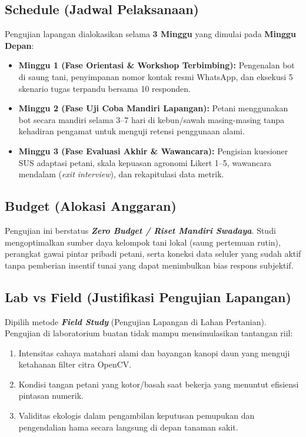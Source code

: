 \documentclass[11pt,a4paper]{article}
\begin{document}
\subsection{Schedule (Jadwal Pelaksanaan)}
Pengujian lapangan dialokasikan selama \textbf{3 Minggu} yang dimulai pada \textbf{Minggu Depan}:
\begin{itemize}[noitemsep]
    \item \textbf{Minggu 1 (Fase Orientasi \& Workshop Terbimbing):} Pengenalan bot di saung tani, penyimpanan nomor kontak resmi WhatsApp, dan eksekusi 5 skenario tugas terpandu bersama 10 responden.
    \item \textbf{Minggu 2 (Fase Uji Coba Mandiri Lapangan):} Petani menggunakan bot secara mandiri selama 3--7 hari di kebun/sawah masing-masing tanpa kehadiran pengamat untuk menguji retensi penggunaan alami.
    \item \textbf{Minggu 3 (Fase Evaluasi Akhir \& Wawancara):} Pengisian kuesioner SUS adaptasi petani, skala kepuasan agronomi Likert 1--5, wawancara mendalam (\textit{exit interview}), dan rekapitulasi data metrik.
\end{itemize}

\subsection{Budget (Alokasi Anggaran)}
Pengujian ini berstatus \textbf{\textit{Zero Budget / Riset Mandiri Swadaya}}. Studi mengoptimalkan sumber daya kelompok tani lokal (saung pertemuan rutin), perangkat gawai pintar pribadi petani, serta koneksi data seluler yang sudah aktif tanpa pemberian insentif tunai yang dapat menimbulkan bias respons subjektif.

\subsection{Lab vs Field (Justifikasi Pengujian Lapangan)}
Dipilih metode \textbf{\textit{Field Study}} (Pengujian Lapangan di Lahan Pertanian). Pengujian di laboratorium buatan tidak mampu mensimulasikan tantangan riil:
\begin{enumerate}[label=\alph*., noitemsep]
    \item Intensitas cahaya matahari alami dan bayangan kanopi daun yang menguji ketahanan filter citra OpenCV.
    \item Kondisi tangan petani yang kotor/basah saat bekerja yang menuntut efisiensi pintasan numerik.
    \item Validitas ekologis dalam pengambilan keputusan pemupukan dan pengendalian hama secara langsung di depan tanaman sakit.
\end{enumerate}
\end{document}

